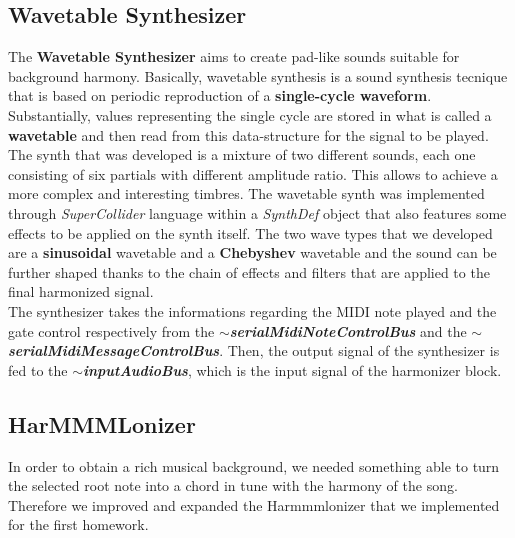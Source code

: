 \documentclass{article}
\begin{document}
\subsection{Wavetable Synthesizer}
The \textbf{Wavetable Synthesizer} aims to create pad-like sounds suitable for background harmony. Basically, wavetable synthesis is a sound synthesis tecnique that is based on periodic reproduction of a \textbf{single-cycle waveform}. Substantially, values representing the single cycle are stored in what is called a \textbf{wavetable} and then read from this data-structure for the signal to be played.
The synth that was developed is a mixture of two different sounds, each one consisting of six partials with different amplitude ratio. This allows to achieve a more complex and interesting timbres. The wavetable synth was implemented through \textit{SuperCollider} language within a \textit{SynthDef} object that also features some effects to be applied on the synth itself. The two wave types that we developed are a \textbf{sinusoidal} wavetable and a \textbf{Chebyshev} wavetable and the sound can be further shaped thanks to the chain of effects and filters that are applied to the final harmonized signal.
\\The synthesizer takes the informations regarding the MIDI note played and the gate control respectively from the \textbf{\textit{$\sim$serialMidiNoteControlBus}} and the \textbf{\textit{$\sim$serialMidiMessageControlBus}}. Then, the output signal of the synthesizer is fed to the \textbf{\textit{$\sim$inputAudioBus}}, which is the input signal of the harmonizer block.

\subsection{HarMMMLonizer}
In order to obtain a rich musical background, we needed something able to turn the selected root note into a chord in tune with the harmony of the song. Therefore we improved and expanded the Harmmmlonizer that we implemented for the first homework.
\end{document}
